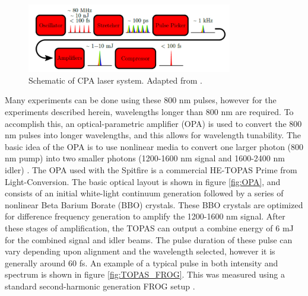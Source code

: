 \begin{figure}
	\centering
	\includegraphics[width=0.8\textwidth]{figures/Beamline/CPA.pdf}
	\caption[Schematic of CPA laser system]{Schematic of CPA laser system. Adapted from \cite{kiesewetterDynamicsNearThresholdAttosecond2019}. }
	\label{fig:CPA}
\end{figure}

Many experiments can be done using these 800 nm pulses, however for the experiments described herein, wavelengths longer than 800 nm are required.  To  accomplish this, an optical-parametric amplifier (OPA) is used to convert the 800 nm pulses into longer wavelengths, and this allows for wavelength tunability.  The basic idea of the OPA is to use nonlinear media to convert one larger photon (800 nm pump) into two smaller photons (1200-1600 nm signal and 1600-2400 nm idler) \cite{boydNonlinearOptics2008}.  The OPA used with the Spitfire is a commercial HE-TOPAS Prime from Light-Conversion.  The basic optical layout is shown in figure \ref{fig:OPA}, and consists of an initial white-light continuum generation followed by a series of nonlinear Beta Barium Borate (BBO) crystals.  These BBO crystals are optimized for difference frequency generation to amplify the 1200-1600 nm signal.  After these stages of amplification, the TOPAS can output a combine energy of 6 mJ for the combined signal and idler beams.  The pulse duration of these pulse can vary depending upon alignment and the wavelength selected, however it is generally around 60 fs. An example of a typical pulse in both intensity and spectrum is shown in figure \ref{fig:TOPAS_FROG}.  This was measured using a standard second-harmonic generation FROG setup \cite{trebinoFrequencyresolvedOpticalGating2000}.

